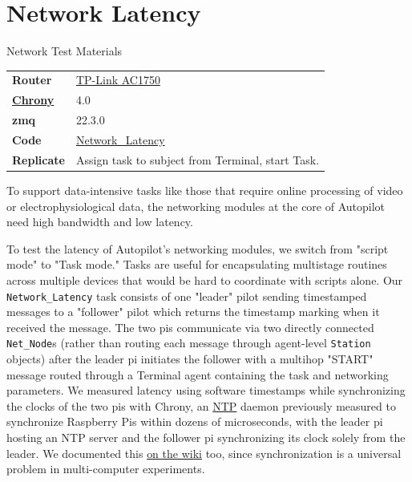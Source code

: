 
\section{Network Latency}
\label{sec:networklatency}


\begin{margintable}[2.5cm]
\caption{Network Test Materials}
\label{tab:materials}
\noindent\begin{tabularx}{\linewidth}{lX}%
\toprule
\textbf{Router} & \href{https://www.tp-link.com/us/home-networking/wifi-router/archer-c7/}{TP-Link AC1750} \\
\href{https://wiki.auto-pi-lot.com/index.php/NTP}{\textbf{Chrony}} & 4.0 \\
\textbf{zmq} & 22.3.0 \\
\textbf{Code} & \href{https://github.com/auto-pi-lot/plugin-paper/blob/main/plugin_paper/tasks/network.py}{Network\_Latency} \\
\textbf{Replicate} & Assign task to subject from Terminal, start Task. \\
\bottomrule
\end{tabularx}
\end{margintable}

To support data-intensive tasks like those that require online processing of video or electrophysiological data, the networking modules at the core of Autopilot need high bandwidth and low latency. 

To test the latency of Autopilot's networking modules, we switch from "script mode" to "Task mode." Tasks are useful for encapsulating multistage routines across multiple devices that would be hard to coordinate with scripts alone. Our \texttt{Network\_Latency} task consists of one "leader" pilot sending timestamped messages to a "follower" pilot which returns the timestamp marking when it received the message. The two pis communicate via two directly connected \texttt{Net\_Node}s (rather than routing each message through agent-level \texttt{Station} objects) after the leader pi initiates the follower with a multihop "START" message routed through a Terminal agent containing the task and networking parameters. We measured latency using software timestamps while synchronizing the clocks of the two pis with Chrony, an \href{https://en.wikipedia.org/wiki/Network\_Time\_Protocol}{NTP} daemon previously measured to synchronize Raspberry Pis within dozens of microseconds\citep{soaresAnalysisTimekeepingExperimentation2020}, with the leader pi hosting an NTP server and the follower pi synchronizing its clock solely from the leader. We documented this \href{https://wiki.auto-pi-lot.com/index.php/NTP}{on the wiki} too, since synchronization is a universal problem in multi-computer experiments.

